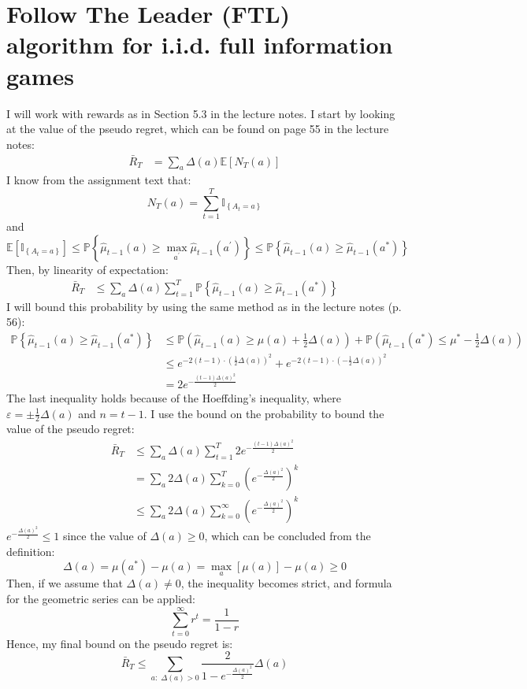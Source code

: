 \documentclass[a4paper]{article}
\begin{document}
\section{Follow The Leader (FTL) algorithm for i.i.d. full information games}
\label{sec:3}
I will work with rewards as in Section
5.3 in the lecture notes. I start by looking at the value of
the pseudo regret, which can be found on page 55 in the lecture notes:
\begin{align*}
  \bar{R}_T &= \sum_{a} \Delta(a) \mathbb{E}\left[N_{T}(a)\right]
\end{align*}
I know from the assignment text that:
\[
N_{T}(a)=\sum_{t=1}^{T} \mathbb{I}_{\left\{A_{t}=a\right\}}
\]
and
\[
\mathbb{E}\left[\mathbb{I}_{\left\{A_{t}=a\right\}}\right]
\leq \mathbb{P}\left\{\hat{\mu}_{t-1}(a) \geq \max _{a^{\prime}}
\hat{\mu}_{t-1}\left(a^{\prime}\right)\right\}
\leq \mathbb{P}\left\{\hat{\mu}_{t-1}(a) \geq \hat{\mu}_{t-1}\left(a^{*}\right)\right\}
\]
Then, by linearity of expectation:
\begin{align*}
  \bar{R}_T &\leq \sum_{a} \Delta(a) \sum_{t=1}^{T}\mathbb{P}\left\{\hat{\mu}_{t-1}(a) \geq \hat{\mu}_{t-1}\left(a^{*}\right)\right\}
\end{align*}
I will bound this probability by using the same method as in the lecture
notes (p. 56):
\begin{align*}
  \mathbb{P}\left\{\hat{\mu}_{t-1}(a) \geq \hat{\mu}_{t-1}\left(a^{*}\right)\right\}
  &\leq \mathbb{P}\left(\hat{\mu}_{t-1}(a) \geq \mu(a)+\frac{1}{2}
  \Delta(a)\right)+\mathbb{P}\left(\hat{\mu}_{t-1}\left(a^{*}\right) \leq
  \mu^{*}-\frac{1}{2} \Delta(a)\right) \\
  &\leq e^{-2(t-1) \cdot (\frac{1}{2} \Delta(a))^2} + e^{-2(t-1) \cdot (-\frac{1}{2} \Delta(a))^2} \\
  &=2e^{-\frac{(t-1)\Delta(a)^2}{2}}
\end{align*}
The last inequality holds because of the Hoeffding's inequality, where
$\varepsilon = \pm \frac{1}{2}\Delta(a)$ and $n=t-1$.
I use the bound on the probability to bound the value of the pseudo regret:
\begin{align*}
  \bar{R}_T &\leq \sum_{a} \Delta(a)\sum_{t=1}^{T}2e^{-\frac{(t-1)\Delta(a)^2}{2}}\\
  &=\sum_{a} 2\Delta(a)\sum_{k=0}^{T}(e^{-\frac{\Delta(a)^2}{2}})^k \tag{$k=t-1$} \\
  &\leq \sum_{a} 2\Delta(a)\sum_{k=0}^{\infty}(e^{-\frac{\Delta(a)^2}{2}})^k 
  \tag{since $e > 0$}
\end{align*}
$e^{-\frac{\Delta(a)^2}{2}} \leq 1$ since the value of $\Delta(a) \geq 0$, which
can be concluded from the definition:
\[
\Delta(a)=\mu\left(a^{*}\right)-\mu(a) = \max _{a}[\mu(a)] - \mu(a) \geq 0
\]
Then, if we assume that $\Delta(a) \neq 0$, the
inequality becomes strict, and formula for the geometric series can be applied:
\[
\sum_{t=0}^{\infty} r^{t}=\frac{1}{1-r}\tag{for $r<1$}
\]
Hence, my final bound on the pseudo regret is:
\[
\bar{R}_T \leq \sum_{a:\; \Delta(a) > 0} \frac{2}{1- e^{-\frac{\Delta(a)^2}{2}}}\Delta(a) 
\]
\end{document}
